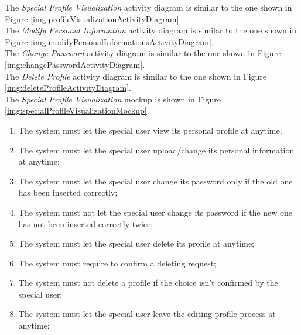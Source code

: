 The \textit{Special Profile Visualization} activity diagram is similar to the one shown in Figure \ref{img:profileVisualizationActivityDiagram}. \\
The \textit{Modify Personal Information} activity diagram is similar to the one shown in Figure \ref{img:modifyPersonalInformationsActivityDiagram}. \\
The \textit{Change Password} activity diagram is similar to the one shown in Figure \ref{img:changePasswordActivityDiagram}. \\
The \textit{Delete Profile} activity diagram is similar to the one shown in Figure \ref{img:deleteProfileActivityDiagram}. \\

The \textit{Special Profile Visualization} mockup is shown in Figure \ref{img:specialProfileVisualizationMockup}.

\begin{enumerate}
  \item The system must let the special user view its personal profile at anytime;
  \item The system must let the special user upload/change its personal information at anytime;
  \item The system must let the special user change its password only if the old one has been inserted correctly;
  \item The system must not let the special user change its password if the new one has not been inserted correctly twice;
  \item The system must let the special user delete its profile at anytime;
  \item The system must require to confirm a deleting request;
  \item The system must not delete a profile if the choice isn't confirmed by the special user;
  \item The system must let the special user leave the editing profile process at anytime;
\end{enumerate}

